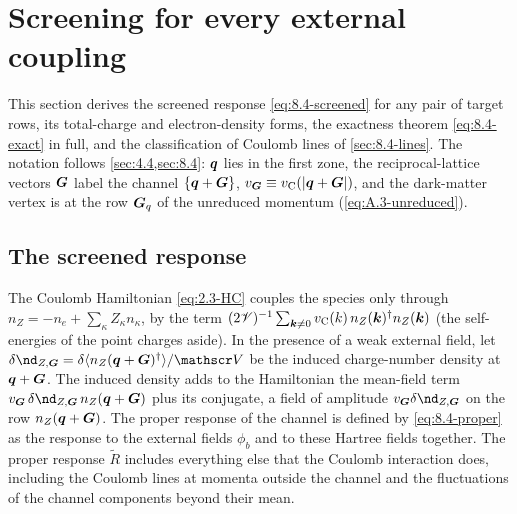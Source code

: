 \section{Screening for every external coupling}\label{app:D.27}

This section derives the screened response \cref{eq:8.4-screened} for any pair of target rows, its total-charge and electron-density forms, the exactness theorem \cref{eq:8.4-exact} in full, and the classification of Coulomb lines of \cref{sec:8.4-lines}. The notation follows \cref{sec:4.4,sec:8.4}: $\bm{q}$ lies in the first zone, the reciprocal-lattice vectors $\bm{G}$ label the channel $\{\bm{q} + \bm{G}\}$, $v_{\bm{G}} \equiv v_{\mathrm{C}}(|\bm{q}+\bm{G}|)$, and the dark-matter vertex is at the row $\bm{G}_q$ of the unreduced momentum (\cref{eq:A.3-unreduced}).

\subsection{The screened response}

The Coulomb Hamiltonian \cref{eq:2.3-HC} couples the species only through $n_Z = -n_e + \sum_\kappa Z_\kappa n_\kappa$, by the term $(2\mathscr{V})^{-1}\sum_{\bm{k}\ne0}v_{\mathrm{C}}(k)\,n_Z(\bm{k})^\dagger n_Z(\bm{k})$ (the self-energies of the point charges aside). In the presence of a weak external field, let $\delta\nd_{Z,\vect{G}} = \delta\langle n_Z(\vect{q}+\vect{G})^\dagger\rangle/\Vol$ be the induced charge-number density at $\bm{q} + \bm{G}$. The induced density adds to the Hamiltonian the mean-field term $v_{\vect{G}}\,\delta\nd_{Z,\vect{G}}\,n_Z(\vect{q}+\vect{G})$ plus its conjugate, a field of amplitude $v_{\vect{G}}\delta\nd_{Z,\vect{G}}$ on the row $n_Z(\bm{q}+\bm{G})$. The proper response of the channel is defined by \cref{eq:8.4-proper} as the response to the external fields $\phi_b$ and to these Hartree fields together. The proper response $\tilde R$ includes everything else that the Coulomb interaction does, including the Coulomb lines at momenta outside the channel and the fluctuations of the channel components beyond their mean.

